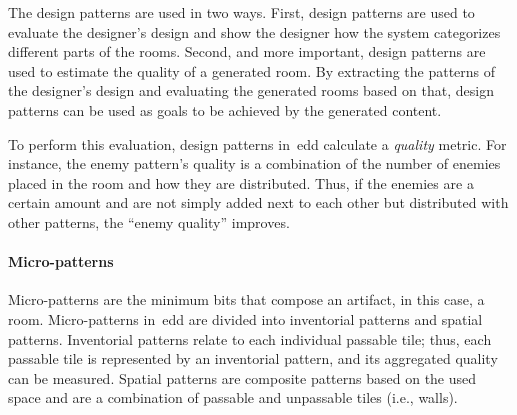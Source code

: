 
The design patterns are used in two ways. First, design patterns are used to evaluate the designer's design and show the designer how the system categorizes different parts of the rooms. Second, and more important, design patterns are used to estimate the quality of a generated room. By extracting the patterns of the designer's design and evaluating the generated rooms based on that, design patterns can be used as goals to be achieved by the generated content. 

To perform this evaluation, design patterns in~\acrshort{edd} calculate a \emph{quality} metric. For instance, the enemy pattern's quality is a combination of the number of enemies placed in the room and how they are distributed. Thus, if the enemies are a certain amount and are not simply added next to each other but distributed with other patterns, the ``enemy quality'' improves.






\paragraph{Micro-patterns}

Micro-patterns are the minimum bits that compose an artifact, in this case, a room. Micro-patterns in~\acrshort{edd} are divided into inventorial patterns and spatial patterns. Inventorial patterns relate to each individual passable tile; thus, each passable tile is represented by an inventorial pattern, and its aggregated quality can be measured. Spatial patterns are composite patterns based on the used space and are a combination of passable and unpassable tiles (i.e., walls).

